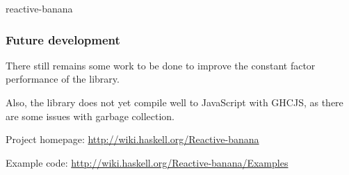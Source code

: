 \begin{hcarentry}[updated]{reactive-banana}
\subsubsection*{Future development}

There still remains some work to be done to improve the constant factor performance of the library.

Also, the library does not yet compile well to JavaScript with GHCJS, as there are some issues with garbage collection.

\FurtherReading
\begin{compactitem}
\item Project homepage: \url{http://wiki.haskell.org/Reactive-banana}
\item Example code: \url{http://wiki.haskell.org/Reactive-banana/Examples}
\end{compactitem}
\end{hcarentry}
